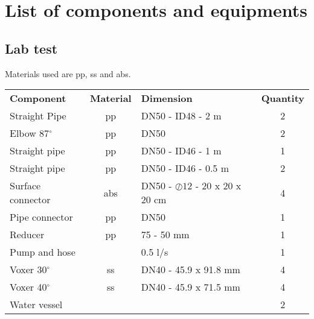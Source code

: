 \chapter{List of components and equipments}\label{appx:third}

\section{Lab test}
Materials used are \gls{pp}, \gls{ss} and \gls{abs}.
\begin{table}[h!]
\centering
\begin{tabular}{lclc}
\textbf{Component} & \textbf{Material} & \textbf{Dimension}           & \textbf{Quantity} \\
Straight Pipe     & \gls{pp}     & DN50 - ID48 - 2 m             & 2        \\
Elbow 87$^{\circ}$          & \gls{pp}      & DN50                         & 2        \\
Straight pipe     & \gls{pp}        & DN50 - ID46 - 1 m             & 1        \\
Straight pipe     & \gls{pp}         & DN50 - ID46 - 0.5 m           & 2        \\
Surface connector & \gls{abs}     & DN50 - $\oslash 12$ - 20 x 20 x 20 cm & 4        \\
Pipe connector    & \gls{pp}         & DN50                         & 1        \\
Reducer           & \gls{pp}          & 75 - 50 mm                   & 1        \\
Pump and hose     &          & 0.5 l/s                      & 1        \\
Voxer 30$^{\circ}$           &     \gls{ss}     & DN40 - 45.9 x 91.8 mm        & 4        \\
Voxer 40$^{\circ}$           &    \gls{ss}      & DN40 - 45.9 x 71.5 mm        & 4        \\
Water vessel      &          &                              & 2        
\end{tabular}
\end{table}

